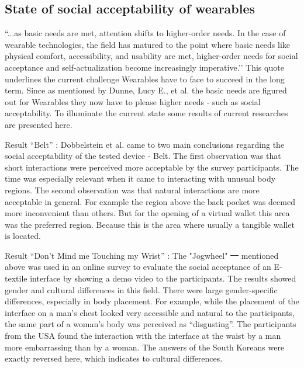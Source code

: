 \documentclass{sigchi}
\providecommand{\DIFaddtex}[1]{{\protect\color{blue}\uwave{#1}}} %
\providecommand{\DIFdeltex}[1]{{\protect\color{red}\sout{#1}}}                      %
\providecommand{\DIFaddbegin}{} %
\providecommand{\DIFaddend}{} %
\providecommand{\DIFdelbegin}{} %
\providecommand{\DIFdelend}{} %
\providecommand{\DIFadd}[1]{\texorpdfstring{\DIFaddtex{#1}}{#1}} %
\providecommand{\DIFdel}[1]{\texorpdfstring{\DIFdeltex{#1}}{}} %
\newcommand{\DIFscaledelfig}{0.5}
\newlength{\DIFdelgraphicswidth} %
\newlength{\DIFdelgraphicsheight} %
\newcommand{\DIFaddincludegraphics}[2][]{{\color{blue}\fbox{\DIFOincludegraphics[#1]{#2}}}} %
\newcommand{\DIFdelincludegraphics}[2][]{%
\sbox{\DIFdelgraphicsbox}{\DIFOincludegraphics[#1]{#2}}%
\settoboxwidth{\DIFdelgraphicswidth}{\DIFdelgraphicsbox} %
\settoboxtotalheight{\DIFdelgraphicsheight}{\DIFdelgraphicsbox} %
\scalebox{\DIFscaledelfig}{%
\parbox[b]{\DIFdelgraphicswidth}{\usebox{\DIFdelgraphicsbox}\\[-\baselineskip] \rule{\DIFdelgraphicswidth}{0em}}\llap{\resizebox{\DIFdelgraphicswidth}{\DIFdelgraphicsheight}{%
\setlength{\unitlength}{\DIFdelgraphicswidth}%
\begin{picture}(1,1)%
\thicklines\linethickness{2pt} %
{\color[rgb]{1,0,0}\put(0,0){\framebox(1,1){}}}%
{\color[rgb]{1,0,0}\put(0,0){\line( 1,1){1}}}%
{\color[rgb]{1,0,0}\put(0,1){\line(1,-1){1}}}%
\end{picture}%
}\hspace*{3pt}}} %
} %
\DeclareRobustCommand{\DIFaddbegin}{\DIFOaddbegin \let\includegraphics\DIFaddincludegraphics} %
\DeclareRobustCommand{\DIFaddend}{\DIFOaddend \let\includegraphics\DIFOincludegraphics} %
\DeclareRobustCommand{\DIFdelbegin}{\DIFOdelbegin \let\includegraphics\DIFdelincludegraphics} %
\DeclareRobustCommand{\DIFdelend}{\DIFOaddend \let\includegraphics\DIFOincludegraphics} %
\begin{document}
\subsection{State of social acceptability of wearables}
``...as basic needs are met, attention shifts to higher-order needs. In the case of wearable technologies, the field has matured to the point where basic needs like physical comfort, accessibility, and usability are met, higher-order needs for social acceptance and self-actualization become increasingly imperative.’’ \cite[p. 4162]{social-comfort} %
This quote underlines the current challenge Wearables have to face to succeed in the long term. Since as mentioned by Dunne, Lucy E., et al. \DIFaddbegin \DIFadd{\mbox{%
\cite{social-comfort} }\hspace{0pt}%
}\DIFaddend the basic needs are figured out for Wearables they now have to please higher needs - such as social acceptability. To illuminate the current state some results of current researches are presented here.


Result “Belt” \cite{belt} : Dobbelstein et al. came to two main conclusions regarding the social acceptability of the tested device - Belt. The first observation was that short interactions were perceived more acceptable by the survey participants. The time was especially relevant when it came to interacting with unusual body regions. The second observation was that natural interactions are more acceptable in general. For example the region above the back pocket was deemed more inconvenient than others. But for the opening of a virtual wallet this area was the preferred region. Because this is the area where usually a tangible wallet is located.

Result “Don’t Mind me Touching my Wrist” \cite{touch-wrist}: The "Jogwheel"  \DIFdelbegin \DIFdel{\mbox{%
\cite{touch-wrist} }\hspace{0pt}%
}\DIFdelend mentioned above was used in an online survey to evaluate the social acceptance of an E-textile interface by showing a demo video to the participants. The results showed gender and cultural differences in this field. There were large gender-specific differences, especially in body placement. For example, while the placement of the interface on a man's chest looked very accessible and natural to the participants, the same part of a woman's body was perceived as “disgusting”. \cite{touch-wrist} The participants from the USA found the interaction with the interface at the waist by a man more embarrassing than by a woman. The answers of the South Koreans were exactly reversed here, which indicates to cultural differences. \cite{touch-wrist}
\end{document}
